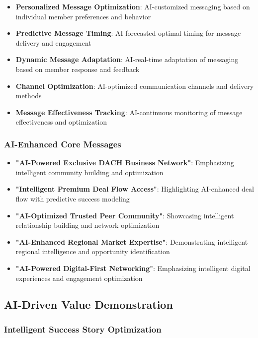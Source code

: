 \begin{itemize}
    \item \textbf{Personalized Message Optimization}: AI-customized messaging based on individual member preferences and behavior
    \item \textbf{Predictive Message Timing}: AI-forecasted optimal timing for message delivery and engagement
    \item \textbf{Dynamic Message Adaptation}: AI-real-time adaptation of messaging based on member response and feedback
    \item \textbf{Channel Optimization}: AI-optimized communication channels and delivery methods
    \item \textbf{Message Effectiveness Tracking}: AI-continuous monitoring of message effectiveness and optimization
\end{itemize}

\subsubsection{AI-Enhanced Core Messages}

\begin{itemize}
    \item \textbf{"AI-Powered Exclusive DACH Business Network"}: Emphasizing intelligent community building and optimization
    \item \textbf{"Intelligent Premium Deal Flow Access"}: Highlighting AI-enhanced deal flow with predictive success modeling
    \item \textbf{"AI-Optimized Trusted Peer Community"}: Showcasing intelligent relationship building and network optimization
    \item \textbf{"AI-Enhanced Regional Market Expertise"}: Demonstrating intelligent regional intelligence and opportunity identification
    \item \textbf{"AI-Powered Digital-First Networking"}: Emphasizing intelligent digital experiences and engagement optimization
\end{itemize}

\subsection{AI-Driven Value Demonstration}

\subsubsection{Intelligent Success Story Optimization}

